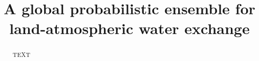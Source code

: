 \documentclass[essd, manuscript]{copernicus}
\begin{document}
\title{A global probabilistic ensemble for land-atmospheric water exchange} %

















\received{}
\pubdiscuss{} %
\revised{}
\accepted{}
\published{}




\maketitle



\begin{abstract}
TEXT
\end{abstract}


\end{document}
